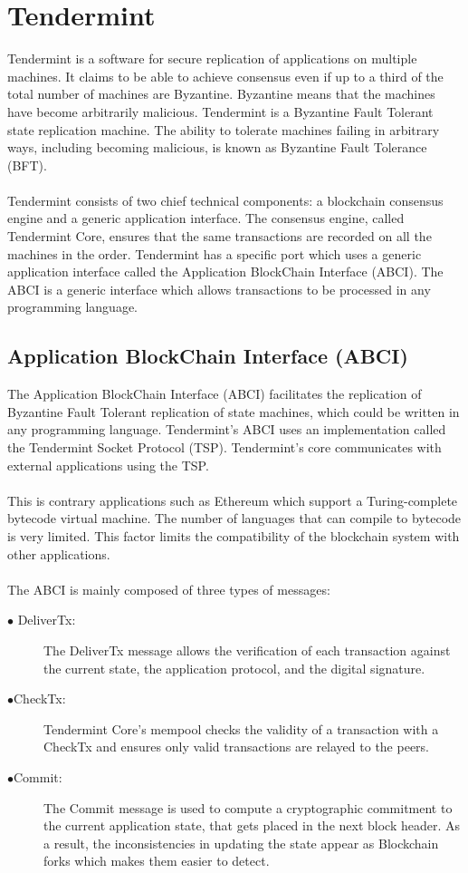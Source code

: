 \documentclass[a4paper,twoside,phd]{BYUPhys}
\begin{document}
\section{Tendermint}
Tendermint is a software for secure replication of applications on multiple machines\cite{}. It claims to be able to achieve consensus even if up to a third of the total number of machines are Byzantine\cite{}. Byzantine means that the machines have become arbitrarily malicious\cite{}. Tendermint is a Byzantine Fault Tolerant state replication machine. The ability to tolerate machines failing in arbitrary ways, including becoming malicious, is known as Byzantine Fault Tolerance (BFT)\cite{}.
\\
\\
Tendermint consists of two chief technical components: a blockchain consensus engine and a generic application interface. The consensus engine, called Tendermint Core, ensures that the same transactions are recorded on all the machines in the order. Tendermint has a specific port which uses a generic application interface called the Application BlockChain Interface (ABCI)\cite{}. The ABCI is a generic interface which allows transactions to be processed in any programming language\cite{}. 

\subsection{Application BlockChain Interface (ABCI)}
The Application BlockChain Interface (ABCI) facilitates the replication of Byzantine Fault Tolerant replication of state machines, which could be written in any programming language. Tendermint's ABCI uses an implementation called the Tendermint Socket Protocol (TSP)\cite{}. Tendermint's core communicates with external applications using the TSP.
\\
\\
This is contrary applications such as Ethereum which support a Turing-complete bytecode virtual machine. The number of languages that can compile to bytecode is very limited. This factor limits the compatibility of the blockchain system with other applications.
\\
\\
The ABCI is mainly composed of three types of messages\cite{}:
\begin{description}
\item[$\bullet$ DeliverTx:] The DeliverTx message allows the verification of each transaction against the current state,  the application protocol, and the digital signature.
\item[$\bullet$CheckTx:] Tendermint Core's mempool checks the validity of a transaction with a CheckTx and ensures only valid transactions are relayed to the peers.
\item[$\bullet$Commit:] The Commit message is used to compute a cryptographic commitment to the current application state, that gets placed in the next block header. As a result, the inconsistencies in updating the state appear as Blockchain forks which makes them easier to detect.
\end{description}
\end{document}
